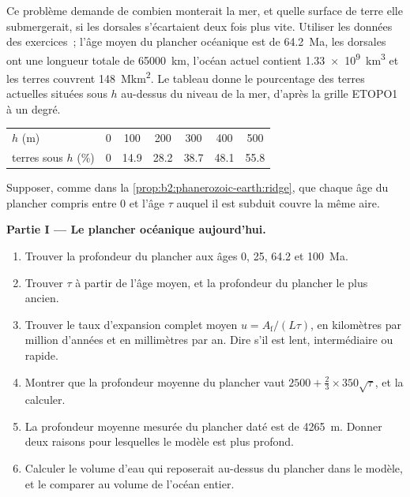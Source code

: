 \begin{problem}\label{pb:b2:phanerozoic-earth:1}
Ce problème demande de combien monterait la mer, et quelle surface de terre elle submergerait, si les
dorsales s'écartaient deux fois plus vite. Utiliser les données des exercices~; l'âge moyen du plancher
océanique est de \qty{64.2}{Ma}, les dorsales ont une longueur totale de \qty{65000}{km}, l'océan actuel
contient \qty{1.33e9}{km^3} et les terres couvrent \qty{148}{\mega km^2}. Le tableau donne le pourcentage
des terres actuelles situées sous $h$ au-dessus du niveau de la mer, d'après la grille ETOPO1 à un degré.
\begin{center}
\small
\begin{tabular}{lcccccc}
\hline
$h$ (\unit{m}) & 0 & 100 & 200 & 300 & 400 & 500 \\
terres sous $h$ (\unit{\percent}) & 0 & 14.9 & 28.2 & 38.7 & 48.1 & 55.8 \\
\hline
\end{tabular}
\end{center}
Supposer, comme dans la \cref{prop:b2:phanerozoic-earth:ridge}, que chaque âge du
plancher compris entre 0 et l'âge $\tau$ auquel il est subduit couvre la même aire.

\noindent\textbf{Partie I --- Le plancher océanique aujourd'hui.}
\begin{enumerate}
  \item Trouver la profondeur du plancher aux âges 0, 25, 64.2 et \qty{100}{Ma}.
  \item Trouver $\tau$ à partir de l'âge moyen, et la profondeur du plancher le plus ancien.
\item Trouver le taux d'expansion complet moyen $u = A_{\text{f}}/(L\tau)$, en kilomètres
par million d'années et en millimètres par an. Dire s'il est lent, intermédiaire ou rapide.
\item Montrer que la profondeur moyenne du plancher vaut
$2500 + \tfrac23 \times 350\sqrt\tau$, et la calculer.
\item La profondeur moyenne mesurée du plancher daté est de \qty{4265}{m}.
Donner deux raisons pour lesquelles le modèle est plus profond.
\item Calculer le volume d'eau qui reposerait au-dessus du plancher
dans le modèle, et le comparer au volume de l'océan entier.
\end{enumerate}


\end{problem}
